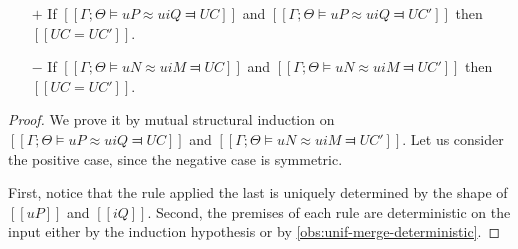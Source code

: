 \begin{observation}
    \label{obs:unif-deterministic}
    \hfill
    \begin{itemize}
        \item [$+$] If $[[Γ ; Θ ⊨ uP ≈u iQ ⫤ UC]]$
            and $[[Γ ; Θ ⊨ uP ≈u iQ ⫤ UC']]$ then $[[UC = UC']]$.
        \item [$-$] If $[[Γ ; Θ ⊨ uN ≈u iM ⫤ UC]]$
            and $[[Γ ; Θ ⊨ uN ≈u iM ⫤ UC']]$ then $[[UC = UC']]$.
    \end{itemize}
\end{observation}
\begin{proof}
    We prove it by mutual structural induction on 
    $[[Γ ; Θ ⊨ uP ≈u iQ ⫤ UC]]$ and $[[Γ ; Θ ⊨ uN ≈u iM ⫤ UC']]$.
    Let us consider the positive case, since the negative case is symmetric.

    First, notice that the rule applied the last is uniquely determined by the
    shape of $[[uP]]$ and $[[iQ]]$.
    Second, the premises of each rule are
    deterministic on the input either by the induction 
    hypothesis or by \cref{obs:unif-merge-deterministic}.
\end{proof}

